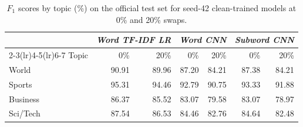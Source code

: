 \begin{table}[H]\centering\normalsize\setlength{\tabcolsep}{5pt}
\begin{tabular}{lrrrrrr}\toprule
 & \multicolumn{2}{c}{\textit{Word TF-IDF LR}} & \multicolumn{2}{c}{\textit{Word CNN}} & \multicolumn{2}{c}{\textit{Subword CNN}} \\
\cmidrule(lr){2-3}\cmidrule(lr){4-5}\cmidrule(lr){6-7}
Topic & 0\% & 20\% & 0\% & 20\% & 0\% & 20\% \\\midrule
World & 90.91 & 89.96 & 87.20 & 84.21 & 87.38 & 84.21 \\
Sports & 95.31 & 94.46 & 92.79 & 90.75 & 93.33 & 91.88 \\
Business & 86.37 & 85.52 & 83.07 & 79.58 & 83.07 & 78.97 \\
Sci/Tech & 87.54 & 86.53 & 84.46 & 82.76 & 84.64 & 82.48 \\
\bottomrule
\end{tabular}
\caption[Per-topic F1 scores]{$F_1$ scores by topic (\%) on the official test set for seed-42 clean-trained models at 0\% and 20\% swaps.}\label{tab:topic-f1}
\end{table}
